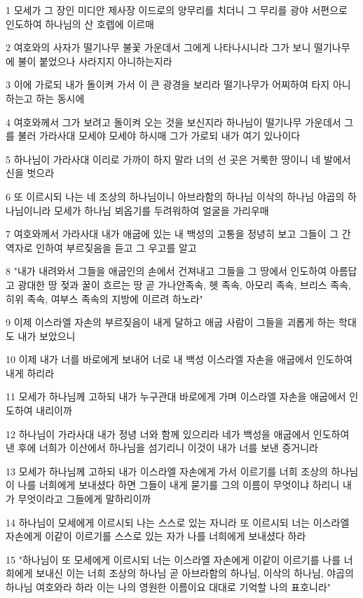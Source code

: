 \par 1 모세가 그 장인 미디안 제사장 이드로의 양무리를 치더니 그 무리를 광야 서편으로 인도하여 하나님의 산 호렙에 이르매
\par 2 여호와의 사자가 떨기나무 불꽃 가운데서 그에게 나타나시니라 그가 보니 떨기나무에 불이 붙었으나 사라지지 아니하는지라
\par 3 이에 가로되 내가 돌이켜 가서 이 큰 광경을 보리라 떨기나무가 어찌하여 타지 아니하는고 하는 동시에
\par 4 여호와께서 그가 보려고 돌이켜 오는 것을 보신지라 하나님이 떨기나무 가운데서 그를 불러 가라사대 모세야 모세야 하시매 그가 가로되 내가 여기 있나이다
\par 5 하나님이 가라사대 이리로 가까이 하지 말라 너의 선 곳은 거룩한 땅이니 네 발에서 신을 벗으라
\par 6 또 이르시되 나는 네 조상의 하나님이니 아브라함의 하나님 이삭의 하나님 야곱의 하나님이니라 모세가 하나님 뵈옵기를 두려워하여 얼굴을 가리우매
\par 7 여호와께서 가라사대 내가 애굽에 있는 내 백성의 고통을 정녕히 보고 그들이 그 간역자로 인하여 부르짖음을 듣고 그 우고를 알고
\par 8 "내가 내려와서 그들을 애굽인의 손에서 건져내고 그들을 그 땅에서 인도하여 아름답고 광대한 땅 젖과 꿀이 흐르는 땅 곧 가나안족속, 헷 족속, 아모리 족속, 브리스 족속, 히위 족속, 여부스 족속의 지방에 이르려 하노라"
\par 9 이제 이스라엘 자손의 부르짖음이 내게 달하고 애굽 사람이 그들을 괴롭게 하는 학대도 내가 보았으니
\par 10 이제 내가 너를 바로에게 보내어 너로 내 백성 이스라엘 자손을 애굽에서 인도하여 내게 하리라
\par 11 모세가 하나님께 고하되 내가 누구관대 바로에게 가며 이스라엘 자손을 애굽에서 인도하여 내리이까
\par 12 하나님이 가라사대 내가 정녕 너와 함께 있으리라 네가 백성을 애굽에서 인도하여 낸 후에 너희가 이산에서 하나님을 섬기리니 이것이 내가 너를 보낸 증거니라
\par 13 모세가 하나님께 고하되 내가 이스라엘 자손에게 가서 이르기를 너희 조상의 하나님이 나를 너희에게 보내셨다 하면 그들이 내게 묻기를 그의 이름이 무엇이냐 하리니 내가 무엇이라고 그들에게 말하리이까
\par 14 하나님이 모세에게 이르시되 나는 스스로 있는 자니라 또 이르시되 너는 이스라엘 자손에게 이같이 이르기를 스스로 있는 자가 나를 너희에게 보내셨다 하라
\par 15 "하나님이 또 모세에게 이르시되 너는 이스라엘 자손에게 이같이 이르기를 나를 너희에게 보내신 이는 너희 조상의 하나님 곧 아브라함의 하나님, 이삭의 하나님, 야곱의 하나님 여호와라 하라 이는 나의 영원한 이름이요 대대로 기억할 나의 표호니라"
